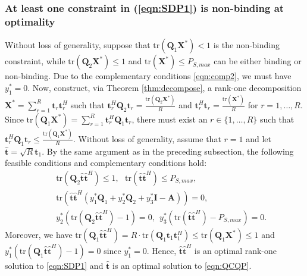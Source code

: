 \documentclass[twocolumn,10pt]{IEEEtran}
\theoremstyle{plain} \newtheorem{theorem}{Theorem}
\theoremstyle{plain} \newtheorem{proposition}{Proposition}
\theoremstyle{plain} \newtheorem{corollary}{Corollary}
\theoremstyle{remark} \newtheorem{remark}{Remark}
\theoremstyle{remark} \newtheorem{lemma}{Lemma}
\theoremstyle{plain} \newtheorem{definition}{Definition}
\theoremstyle{plain} \newtheorem{assumption}{Assumption}
\theoremstyle{plain} \newtheorem{fact}{Fact}
\begin{document}
\subsubsection{\textbf{At least one constraint in (\ref{eqn:SDP1}) is non-binding at optimality}}
Without loss of generality, suppose that $\mathrm{tr}(\mathbf{Q}_1\mathbf{X^*}) <1$ is the non-binding constraint, while $\mathrm{tr}(\mathbf{Q}_2\mathbf{X^*}) \leq 1$ and $\mathrm{tr}(\mathbf{X^*}) \leq P_{S,max}$ can be either binding or non-binding. Due to the complementary conditions \eqref{eqn:comp2}, we must have $y_1^*=0$.  Now, construct, via Theorem \ref{thm:decompose}, a rank-one decomposition $\mathbf{X^*}=\sum_{r=1}^R\mathbf{t}_r\mathbf{t}_r^H$ such that $\mathbf{t}_r^H\mathbf{Q}_2\mathbf{t}_r=\frac{\mathrm{tr}(\mathbf{Q}_2\mathbf{X^*})}{R}$ and $\mathbf{t}_r^H\mathbf{t}_r=\frac{\mathrm{tr}(\mathbf{X^*})}{R}$ for $r=1,\ldots,R$. Since $\mathrm{tr}(\mathbf{Q}_1\mathbf{X^*})=\sum_{r=1}^R\mathbf{t}_r^H\mathbf{Q}_1\mathbf{t}_r$, there must exist an $r\in\{1,\ldots,R\}$ such that $\mathbf{t}_r^H\mathbf{Q}_1\mathbf{t}_r\leq \frac{\mathrm{tr}(\mathbf{Q}_1\mathbf{X^*})}{R}$. Without loss of generality, assume that $r=1$ and let $\mathbf{\hat{t}}=\sqrt{R}\mathbf{t}_1$. By the same argument as in the preceding subsection, the following feasible conditions and complementary conditions hold:
\begin{eqnarray*}
&&\mathrm{tr}(\mathbf{Q}_2\mathbf{\hat{t}}\mathbf{\hat{t}}^H) \leq 1,~~~
\mathrm{tr}(\mathbf{\hat{t}}\mathbf{\hat{t}}^H) \leq P_{S,max},\\
&&\mathrm{tr}\left(\mathbf{\hat{t}}\mathbf{\hat{t}}^H\left(y_1^*\mathbf{Q}_1+y_2^*\mathbf{Q}_2+y_3^*\mathbf{I}-\mathbf{A}\right)\right)=0,\\
&&y_2^*\left(\mathrm{tr}(\mathbf{Q}_2\mathbf{\hat{t}}\mathbf{\hat{t}}^H)-1\right)=0,~~
y_3^*\left(\mathrm{tr}(\mathbf{\hat{t}}\mathbf{\hat{t}}^H)-P_{S,max}\right)=0.
\end{eqnarray*}
Moreover, we have $\mathrm{tr}(\mathbf{Q}_1\mathbf{\hat{t}}\mathbf{\hat{t}}^H)=R\cdot\mathrm{tr}(\mathbf{Q}_1\mathbf{t}_1\mathbf{t}_1^H) \le \mathrm{tr}(\mathbf{Q}_1\mathbf{X^*})\leq 1$ and $y_1^*\left(\mathrm{tr}(\mathbf{Q}_1\mathbf{\hat{t}}\mathbf{\hat{t}}^H)-1\right)=0$ since $y_1^*=0$.  Hence, $\mathbf{\hat{t}}\mathbf{\hat{t}}^H$ is an optimal rank-one solution to \eqref{eqn:SDP1} and $\mathbf{\hat{t}}$ is an optimal solution to \eqref{eqn:QCQP}.
\end{document}
